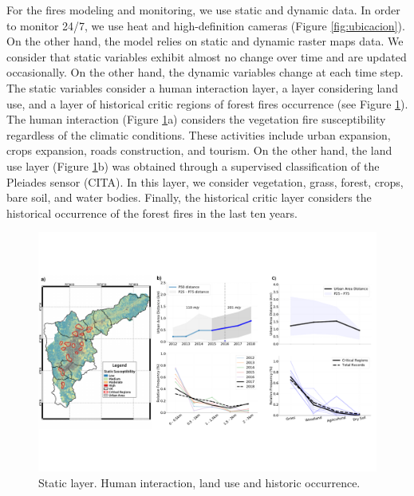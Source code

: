 For the fires modeling and monitoring, we use static and dynamic data.  In order to monitor 24/7, we use heat and high-definition cameras (Figure \ref{fig:ubicacion}). On the other hand, the model relies on static and dynamic raster maps data. We consider that static variables exhibit almost no change over time and are updated occasionally.  On the other hand, the dynamic variables change at each time step.\\     

The static variables consider a human interaction layer, a layer considering land use, and a layer of historical critic regions of forest fires occurrence (see Figure \ref{fig:staticLayers}). The human interaction (Figure \ref{fig:staticLayers}a) considers the vegetation fire susceptibility regardless of the climatic conditions.  These activities include urban expansion, crops expansion, roads construction, and tourism.  On the other hand, the land use layer (Figure \ref{fig:staticLayers}b) was obtained through a supervised classification of the Pleiades sensor (CITA). In this layer, we consider vegetation, grass, forest, crops, bare soil, and water bodies. Finally, the historical critic layer considers the historical occurrence of the forest fires in the last ten years.\\

\begin{figure}
  \centering
  \includegraphics[width=1.0\linewidth]{Figuras/static_composition1.pdf}
  \caption{Static layer. Human interaction, land use and historic occurrence.}
  \label{fig:staticLayers}
\end{figure}

